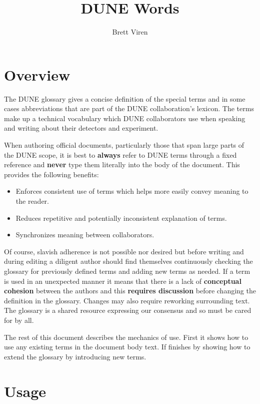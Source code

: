 \documentclass{article}
\title{DUNE Words}
\author{Brett Viren}
\begin{document}
\maketitle
\tableofcontents

\section{Overview}

The DUNE glossary gives a concise definition of the special terms and
in some cases abbreviations that are part of the DUNE collaboration's
lexicon.
The terms make up a technical vocabulary which DUNE collaborators
use when speaking and writing about their detectors and experiment.

When authoring official documents, particularly those that span large
parts of the DUNE scope, it is best to \textbf{always} refer to DUNE terms
through a fixed reference and \textbf{never} type them literally into
the body of the document.
This provides the following benefits:


\begin{itemize}
\item Enforces consistent use of terms which helps more easily convey
  meaning to the reader.
\item Reduces repetitive and potentially inconsistent explanation of
  terms.  
\item Synchronizes meaning between collaborators.
\end{itemize}

\noindent Of course, slavish adherence is not possible nor desired but
before writing and during editing a diligent author should find
themselves continuously checking the glossary for previously defined
terms and adding new terms as needed. 
If a term is used in an unexpected manner it means that there is a
lack of \textbf{conceptual cohesion} between the authors and this
\textbf{requires discussion} before changing the definition in the
glossary. 
Changes may also require reworking surrounding text. 
The glossary is a shared resource expressing our consensus and so must
be cared for by all.

The rest of this document describes the mechanics of use. 
First it shows how to use any existing terms in the document body
text. 
If finishes by showing how to extend the glossary by introducing new
terms.


\section{Usage}
\end{document}
